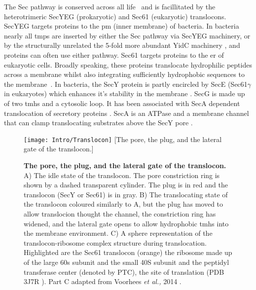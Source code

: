 The Sec pathway is conserved across all life~\cite{Cao2003} and is facillitated by the heterotrimeric SecYEG (prokaryotic) and Sec61 (eukaryotic) translocons.
SecYEG targets proteins to the \gls{pm} (inner membrane) of bacteria.
In bacteria nearly all \gls{tmp}s are inserted by either the Sec pathway via  SecYEG machinery, or by the structurally unrelated the 5\--fold more abundant YidC machinery \cite{Drew2003, Dalby2014}, and proteins can often use either pathway.
Sec61 targets proteins to the \gls{er} of eukaryotic cells.
Broadly speaking, these proteins translocate hydrophilic peptides across a membrane whilst also integrating sufficiently hydrophobic sequences to the membrane~\cite{Junne2010, Rapoport2012, Shao2011, Cymer2015}.
In bacteria, the SecY protein is partly encircled by SecE (Sec61$\gamma$ in eukaryotes) which enhances it's stability in the membrane \cite{Kihara1995}.
SecG is made up of two \gls{tmh}s and a cytosolic loop.
It has been associated with SecA dependent translocation of secretory proteins \cite{Duong1997, Koch2000}.
SecA is an ATPase and a membrane channel that can clamp translocating substrates above the SecY pore \cite{Zimmer2008}.

\begin{figure}[ht!]
\centering
\texttt{[image: Intro/Translocon]}
	 [The pore, the plug, and the lateral gate of the translocon.]{\textbf{The pore, the plug, and the lateral gate of the translocon.}
	 A) The idle state of the translocon.
	 The pore constriction ring is shown by a dashed transparent cylinder.
	 The plug is in red and the translocon (SecY or Sec61) is in gray.
	 B) The translocating state of the translocon coloured similarly to A, but the plug has moved to allow translocion thought the channel, the constriction ring has widened, and the lateral gate opens to allow hydrophobic \gls{tmh}s into the membrane environment.
	 C) A sphere representation of the translocon-ribosome complex structure during translocation.
	 Highlighted are the Sec61 translocon (orange) the ribosome made up of the large 60s subunit and the small 40S subunit and the peptidyl transferase center (denoted by PTC), the site of translation (PDB 3J7R \cite{Voorhees2014}).
	 Part C adapted from Voorhees \textit{et al.,} 2014 \cite{Voorhees2014}.

	 }
\label{fig:Translocon}
\end{figure}

